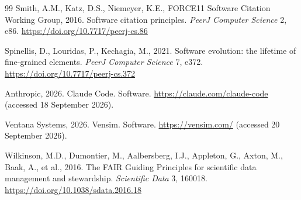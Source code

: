 \documentclass[11pt,a4paper]{article}
\begin{document}
\begin{thebibliography}{99}
Smith, A.M., Katz, D.S., Niemeyer, K.E., FORCE11 Software Citation Working Group, 2016. Software citation principles. \emph{PeerJ Computer Science} 2, e86. \url{https://doi.org/10.7717/peerj-cs.86}

Spinellis, D., Louridas, P., Kechagia, M., 2021. Software evolution: the lifetime of fine-grained elements. \emph{PeerJ Computer Science} 7, e372. \url{https://doi.org/10.7717/peerj-cs.372}

Anthropic, 2026. Claude Code. Software. \url{https://claude.com/claude-code} (accessed 18 September 2026).

Ventana Systems, 2026. Vensim. Software. \url{https://vensim.com/} (accessed 20 September 2026).

Wilkinson, M.D., Dumontier, M., Aalbersberg, I.J., Appleton, G., Axton, M., Baak, A., et al., 2016. The FAIR Guiding Principles for scientific data management and stewardship. \emph{Scientific Data} 3, 160018. \url{https://doi.org/10.1038/sdata.2016.18}


\end{thebibliography}
% 
\end{document}
